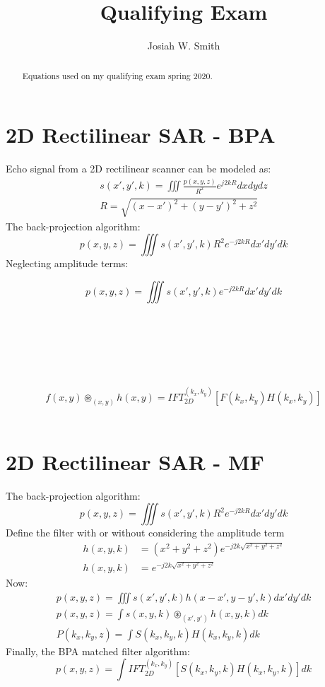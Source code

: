 \documentclass{article}
\title{Qualifying Exam}
\author{Josiah W. Smith}
\begin{document}
	
\maketitle
	
\begin{abstract}

Equations used on my qualifying exam spring 2020.
		
\end {abstract}

\section{2D Rectilinear SAR - BPA}
Echo signal from a 2D rectilinear scanner can be modeled as:
\begin{gather}
	s(x',y',k) = \iiint \frac{p(x,y,z)}{R^2}e^{j2kR}dxdydz \\
	R = \sqrt{(x - x')^2 + (y - y')^2 + z^2}
\end{gather}
The back-projection algorithm:
\begin{equation}
	p(x,y,z) = \iiint s(x',y',k) R^2 e^{-j2kR} dx'dy'dk
\end{equation}
Neglecting amplitude terms:

\begin{equation}
	p(x,y,z) = \iiint s(x',y',k) e^{-j2kR} dx'dy'dk\textit{}
\end{equation}
\\ \\ \\ \\ \\ \\
\begin{equation}
	f(x,y) \circledast_{(x,y)} h(x,y) = IFT_{2D}^{(k_x,k_y)}\left[ F(k_x,k_y) H(k_x,k_y) \right]
\end{equation} \\

\section{2D Rectilinear SAR - MF}
The back-projection algorithm:
\begin{equation}
p(x,y,z) = \iiint s(x',y',k) R^2 e^{-j2kR} dx'dy'dk
\end{equation}
Define the filter with or without considering the amplitude term
\begin{align}
	h(x,y,k) &= (x^2 + y^2 + z^2) e^{-j2k\sqrt{x^2 + y^2 + z^2}} \\
	h(x,y,k) &= e^{-j2k\sqrt{x^2 + y^2 + z^2}}
\end{align}
Now:
\begin{gather}
	p(x,y,z) = \iiint s(x',y',k) h(x - x',y - y',k) dx'dy'dk \\
	p(x,y,z) = \int s(x,y,k) \circledast_{(x',y')}h(x,y,k)dk \\
	P(k_x,k_y,z) = \int S(k_x,k_y,k) H(k_x,k_y,k) dk
\end{gather}
Finally, the BPA matched filter algorithm:
\begin{equation}
	p(x,y,z) = \int IFT_{2D}^{(k_x,k_y)}[S(k_x,k_y,k) H(k_x,k_y,k)]dk
\end{equation}
\end{document}
